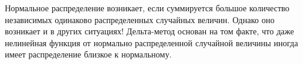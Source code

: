 \documentclass[12pt, a4paper, oneside]{article}
\begin{document}
Нормальное распределение возникает, если суммируется большое количество независимых одинаково распределенных случайных величин. Однако оно возникает и в других ситуациях! Дельта-метод основан на том факте, что даже нелинейная функция от нормально распределенной случайной величины  иногда имеет распределение близкое к нормальному.














\end{document}
